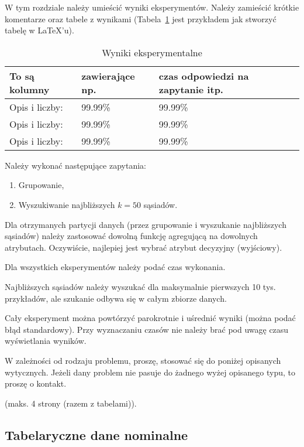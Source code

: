\documentclass[a4paper,11pt]{article}
\begin{document}
W tym rozdziale należy umieścić wyniki eksperymentów. Należy zamieścić krótkie komentarze oraz tabele z wynikami (Tabela~\ref{tab:problem_1} jest przykładem jak stworzyć tabelę w \LaTeX'u).

\begin{table}
\begin{center}
\begin{tabular}{lll}
To są kolumny & zawierające np. & czas odpowiedzi na zapytanie itp. \\ 
\hline
Opis i liczby: & 99.99\% & 99.99\% \\
Opis i liczby: & 99.99\% & 99.99\% \\
Opis i liczby: & 99.99\% & 99.99\% \\
\hline
\end{tabular}
\end{center}
\caption{Wyniki eksperymentalne}
\label{tab:problem_1}
\end{table}

Należy wykonać następujące zapytania:
\begin{enumerate}
\item Grupowanie,
\item Wyszukiwanie najbliższych $k = 50$ sąsiadów.
\end{enumerate}

Dla otrzymanych partycji danych (przez grupowanie i wyszukanie najbliższych sąsiadów) należy zastosować dowolną funkcję agregującą na dowolnych atrybutach. Oczywiście, najlepiej jest wybrać atrybut decyzyjny (wyjściowy).

Dla wszystkich eksperymentów należy podać czas wykonania. 

Najbliższych sąsiadów należy wyszukać dla maksymalnie pierwszych 10 tys. przykładów, ale szukanie odbywa się w całym zbiorze danych.

Cały eksperyment można powtórzyć parokrotnie i uśrednić wyniki (można podać błąd standardowy). Przy wyznaczaniu czasów nie należy brać pod uwagę czasu wyświetlania wyników.

W zależności od rodzaju problemu, proszę, stosować się do poniżej opisanych wytycznych. Jeżeli dany problem nie pasuje do żadnego wyżej opisanego typu, to proszę o kontakt. 

(maks. 4 strony (razem z tabelami)). 

\subsection{Tabelaryczne dane nominalne}
\end{document}
